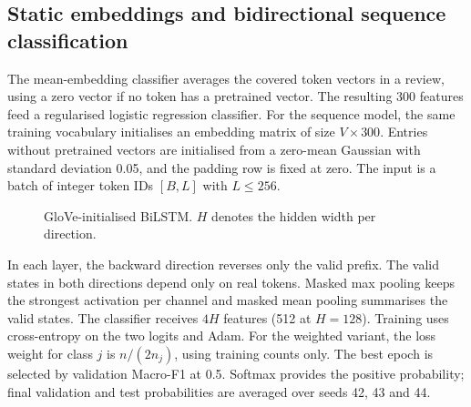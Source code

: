\subsection{Static embeddings and bidirectional sequence classification}
The mean-embedding classifier averages the covered token vectors in a review,
using a zero vector if no token has a pretrained vector. The resulting 300
features feed a regularised logistic regression classifier.
For the sequence model, the same training vocabulary initialises an embedding
matrix of size $V\times300$. Entries without pretrained vectors are initialised
from a zero-mean Gaussian with standard deviation 0.05, and the padding row is
fixed at zero. The input is a batch of integer token IDs $[B,L]$ with $L\le256$.

\begin{figure}[ht]
\centering
{}
\caption{GloVe-initialised BiLSTM. $H$ denotes the hidden width per direction.}
\label{fig:bilstm}
\end{figure}

In each layer, the backward direction reverses only the valid prefix. The valid states in
both directions depend only on real tokens. Masked max pooling
keeps the strongest activation per channel and masked mean pooling summarises
the valid states. The classifier receives $4H$ features (512 at $H=128$).
Training uses cross-entropy on the two logits and Adam. For the weighted variant,
the loss weight for class $j$ is $n/(2n_j)$, using training counts only.
The best epoch is selected by validation Macro-F1 at 0.5. Softmax provides the
positive probability; final validation and test probabilities are averaged
over seeds 42, 43 and 44.
